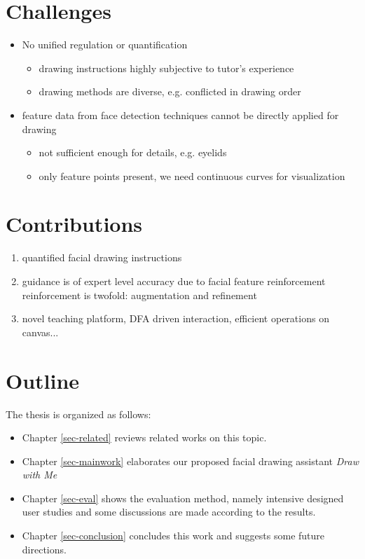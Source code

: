 \section{Challenges}

	\begin{itemize}
		\item No unified regulation or quantification
			\begin{itemize}
				\item drawing instructions highly subjective to tutor’s experience
				\item drawing methods are diverse, e.g. conflicted in drawing order
			\end{itemize}
			
		\item feature data from face detection techniques cannot be directly applied for drawing
			\begin{itemize}
				\item not sufficient enough for details, e.g. eyelids
				\item only feature points present, we need continuous curves for visualization
			\end{itemize}
	\end{itemize}
	

\section{Contributions}
	
	\begin{enumerate}
		\item quantified facial drawing instructions
		\item guidance is of expert level accuracy due to facial feature reinforcement\\
					reinforcement is twofold: augmentation and refinement\\
		\item novel teaching platform, DFA driven interaction, efficient operations on canvas...
	\end{enumerate}
		
\section{Outline}
	The thesis is organized as follows:
		
		\begin{itemize}
			\item Chapter \ref{sec-related} reviews related works on this topic.
			\item Chapter \ref{sec-mainwork} elaborates our proposed facial drawing assistant \textsl{Draw with Me}
			\item Chapter \ref{sec-eval} shows the evaluation method, namely intensive designed user studies and some discussions are made according to the results.
			\item Chapter \ref{sec-conclusion} concludes this work and suggests some future directions.
		\end{itemize}

